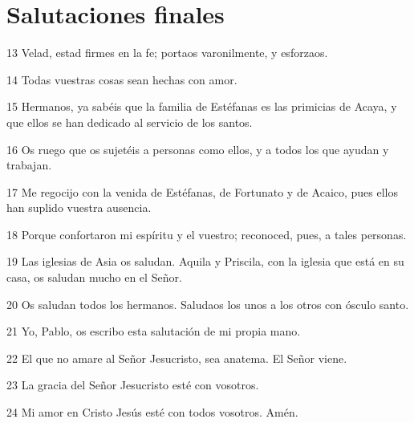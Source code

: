 \section*{Salutaciones finales}

\par 13 Velad, estad firmes en la fe; portaos varonilmente, y esforzaos.
\par 14 Todas vuestras cosas sean hechas con amor.
\par 15 Hermanos, ya sabéis que la familia de Estéfanas es las primicias de Acaya, y que ellos se han dedicado al servicio de los santos.
\par 16 Os ruego que os sujetéis a personas como ellos, y a todos los que ayudan y trabajan.
\par 17 Me regocijo con la venida de Estéfanas, de Fortunato y de Acaico, pues ellos han suplido vuestra ausencia.
\par 18 Porque confortaron mi espíritu y el vuestro; reconoced, pues, a tales personas.
\par 19 Las iglesias de Asia os saludan. Aquila y Priscila, con la iglesia que está en su casa, os saludan mucho en el Señor.
\par 20 Os saludan todos los hermanos. Saludaos los unos a los otros con ósculo santo.
\par 21 Yo, Pablo, os escribo esta salutación de mi propia mano.
\par 22 El que no amare al Señor Jesucristo, sea anatema. El Señor viene.
\par 23 La gracia del Señor Jesucristo esté con vosotros.
\par 24 Mi amor en Cristo Jesús esté con todos vosotros. Amén.


